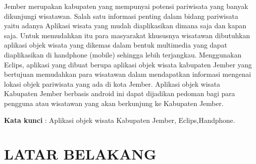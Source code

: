 \documentclass{jtetiproposalskripsi}
\begin{document}
\cover

\approvalpage


\begin{abstractind}
Jember merupakan kabupaten yang mempunyai potensi pariwisata yang banyak dikunjungi wisatawan. Salah satu informasi penting dalam bidang pariwisata yaitu adanya Aplikasi wisata yang mudah diaplikasikan dimana saja dan kapan saja. Untuk memudahkan itu para masyarakat khususnya wisatawan dibutuhkan aplikasi objek wisata yang dikemas dalam bentuk multimedia yang dapat diaplikasikan di handphone (mobile) sehingga lebih terjangkau. Menggunakan Eclips, aplikasi yang dibuat berupa aplikasi objek wisata kabupaten Jember yang bertujuan memudahkan para wisatawan dalam mendapatkan informasi mengenai lokasi objek pariwisata yang ada di kota Jember. Aplikasi objek wisata Kabupaten Jember berbasis android ini dapat dijadikan pedoman bagi para pengguna atau wisatawan yang akan berkunjung ke Kabupaten Jember. 


\bigskip
\textbf{Kata kunci} : Aplikasi objek wisata Kabupaten Jember, Eclips,Handphone.
\end{abstractind}

\tableofcontents
{}
\clearpage{}\setcounter{page}{1}

\chapter{LATAR BELAKANG}
\end{document}
